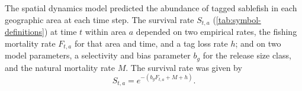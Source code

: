 \documentclass{article}
\begin{document}
The spatial dynamics model predicted the abundance of tagged sablefish in each geographic area at each time step. The survival rate $S_{t, a}$ (\autoref{tab:symbol-definitions}) at time $t$ within area $a$ depended on two empirical rates, the fishing mortality rate $F_{t, a}$ for that area and time, and a tag loss rate $h$; and on two model parameters, a selectivity and bias parameter $b_g$ for the release size class, and the natural mortality rate $M$. The survival rate was given by
%
\begin{equation}
  \label{eq:survival}
  S_{t,a} = e^{-(b_g F_{t,a} + M + h)}.
\end{equation}
%


\end{document}

